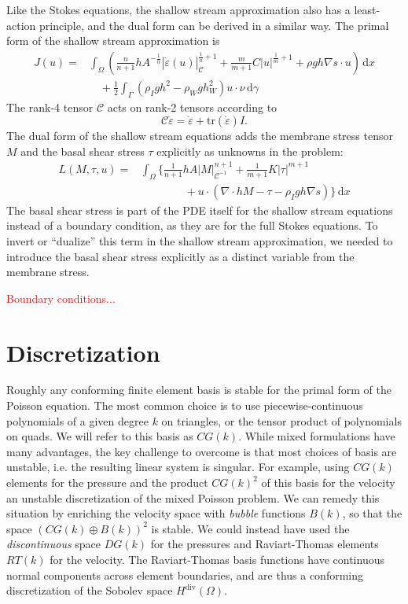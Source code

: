 \documentclass{article}
\theoremstyle{definition}
\theoremstyle{plain}
\newcommand{\ud}{\hspace{2pt}\mathrm{d}}
\begin{document}
Like the Stokes equations, the shallow stream approximation also has a least-action principle, and the dual form can be derived in a similar way.
The primal form of the shallow stream approximation is
\begin{align}
    J(u) = & \int_\Omega\left(\frac{n}{n + 1}hA^{-\frac{1}{n}}|\dot\varepsilon(u)|_{\mathscr{C}}^{\frac{1}{n} + 1} + \frac{m}{m + 1}C|u|^{\frac{1}{m} + 1} + \rho gh\nabla s\cdot u\right)\ud x \nonumber \\
    & \quad + \frac{1}{2}\int_\Gamma\left(\rho_Igh^2 - \rho_Wgh_W^2\right)u\cdot\nu\ud\gamma
\end{align}
The rank-4 tensor $\mathscr{C}$ acts on rank-2 tensors according to
\begin{equation}
    \mathscr{C}\dot\varepsilon = \dot\varepsilon + \text{tr}(\dot\varepsilon)I.
\end{equation}
The dual form of the shallow stream equations adds the membrane stress tensor $M$ and the basal shear stress $\tau$ explicitly as unknowns in the problem:
\begin{align}
    L(M, \tau, u) = & \int_\Omega\Bigg\{\frac{1}{n + 1}hA|M|_{\mathscr{C}^{-1}}^{n + 1} + \frac{1}{m + 1}K|\tau|^{m + 1} \nonumber\\
    & \qquad\qquad + u\cdot\left(\nabla\cdot hM - \tau - \rho_Igh\nabla s\right)\Bigg\}\ud x
\end{align}
The basal shear stress is part of the PDE itself for the shallow stream equations instead of a boundary condition, as they are for the full Stokes equations.
To invert or ``dualize'' this term in the shallow stream approximation, we needed to introduce the basal shear stress explicitly as a distinct variable from the membrane stress.

\textcolor{red}{Boundary conditions...}


\section{Discretization}

Roughly any conforming finite element basis is stable for the primal form of the Poisson equation.
The most common choice is to use piecewise-continuous polynomials of a given degree $k$ on triangles, or the tensor product of polynomials on quads.
We will refer to this basis as $CG(k)$.
While mixed formulations have many advantages, the key challenge to overcome is that most choices of basis are unstable, i.e. the resulting linear system is singular.
For example, using $CG(k)$ elements for the pressure and the product $CG(k)^2$ of this basis for the velocity an unstable discretization of the mixed Poisson problem.
We can remedy this situation by enriching the velocity space with \emph{bubble} functions $B(k)$, so that the space $(CG(k) \oplus B(k))^2$ is stable.
We could instead have used the \emph{discontinuous} space $DG(k)$ for the pressures and Raviart-Thomas elements $RT(k)$ for the velocity.
The Raviart-Thomas basis functions have continuous normal components across element boundaries, and are thus a conforming discretization of the Sobolev space $H^{\text{div}}(\Omega)$.
\end{document}
